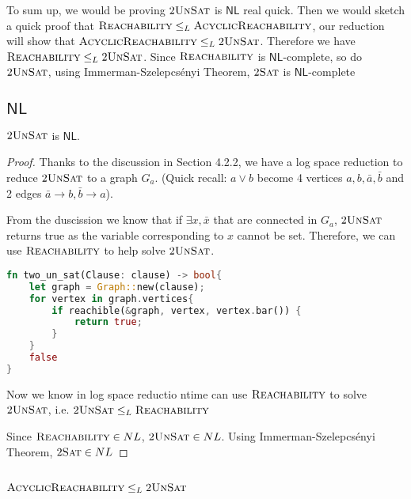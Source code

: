 To sum up, we would be proving $2\textsc{UnSat}$ is $\mathsf{NL}$ real quick.
Then we would sketch a quick proof that $\textsc{Reachability} \le_L \textsc{AcyclicReachability}$, our reduction will show that $\textsc{AcyclicReachability} \le_L 2\textsc{UnSat}$.
Therefore we have $\textsc{Reachability} \le_L 2\textsc{UnSat}$.
Since $\textsc{Reachability}$ is $\mathsf{NL}$-complete, so do $2\textsc{UnSat}$, using Immerman-Szelepcs\'{e}nyi Theorem,  $2\textsc{Sat}$ is $\mathsf{NL}$-complete

\subsection*{$\mathsf{NL}$}

\begin{theorem}
    $2\textsc{UnSat}$ is $\mathsf{NL}$.
\end{theorem}
\begin{proof}
    Thanks to the discussion in Section 4.2.2, we have a log space reduction to reduce $2\textsc{UnSat}$ to a graph $G_a$.
    (Quick recall: $a \vee b$ become 4 vertices $a, b, \bar{a}, \bar{b}$ and 2 edges $\bar{a} \rightarrow b, \bar{b} \rightarrow a$).

    From the duscission we know that if $\exists x, \bar{x}$ that are connected in $G_a$, $2\textsc{UnSat}$ returns true as the variable corresponding to $x$ cannot be set.
    Therefore, we can use $\textsc{Reachability}$ to help solve $2\textsc{UnSat}$.

    \begin{lstlisting}[language = Rust]
fn two_un_sat(Clause: clause) -> bool{
    let graph = Graph::new(clause);
    for vertex in graph.vertices{
        if reachible(&graph, vertex, vertex.bar()) {
            return true;
        }
    }
    false
}\end{lstlisting}

    Now we know in log space reductio ntime can use $\textsc{Reachability}$ to solve $2\textsc{UnSat}$, i.e. $2\textsc{UnSat} \le_L \textsc{Reachability}$

    Since $\textsc{Reachability} \in NL$, $2\textsc{UnSat} \in NL$.
    Using Immerman-Szelepcs\'{e}nyi Theorem, $2\textsc{Sat} \in NL$
\end{proof}

\subsection*{$\textsc{AcyclicReachability} \le_L 2\textsc{UnSat}$}

